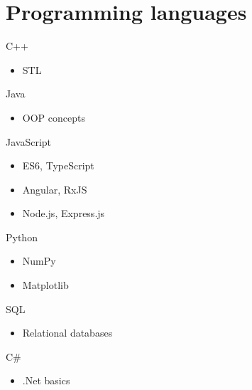 \documentclass[11pt,a4paper,sans]{moderncv}			%
\begin{document}





\section{Programming languages}

\cvdoubleitem
{C++}{
\begin{itemize}
	\item STL
\end{itemize}
}
{Java}{
\begin{itemize}
	\item OOP concepts
\end{itemize}
}

\cvdoubleitem
{JavaScript}{
\begin{itemize}
	\item ES6, TypeScript
	\item Angular, RxJS
	\item Node.js, Express.js
\end{itemize}}
{Python}{
\begin{itemize}
	\item NumPy
	\item Matplotlib
\end{itemize}
}

\cvdoubleitem
{SQL}{
\begin{itemize}
	\item Relational databases
\end{itemize}
}
{C\#}{
\begin{itemize}
	\item .Net basics
\end{itemize}
}

\end{document}
